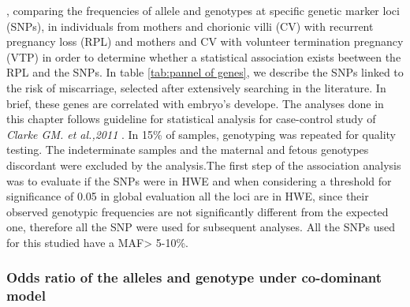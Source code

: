 \documentclass[journal,article,submit,moreauthors,pdftex]{Definitions/mdpi}
\begin{document}
, comparing the frequencies of allele and genotypes at specific genetic marker loci (SNPs), in individuals from mothers and chorionic villi (CV) with recurrent pregnancy loss (RPL) and mothers and CV with volunteer termination pregnancy (VTP) in order to determine whether a statistical association exists beetween the RPL and the SNPs. 
In table \ref{tab:pannel of genes}, we describe the SNPs linked to the risk of miscarriage, selected after extensively searching in the literature. In brief, these genes are correlated with embryo's develope. The analyses done in this chapter follows guideline for statistical analysis for case-control study of \textit{ Clarke GM. et al.,2011} \cite{clarke2011basic}. In 15\% of samples, genotyping was repeated for quality testing. The indeterminate samples and the maternal and fetous genotypes discordant were excluded by the analysis.The first step of the association analysis was to evaluate if the SNPs were in HWE and when considering a threshold for significance of 0.05 in global evaluation all the loci are in HWE, since their observed genotypic frequencies are not significantly different from the expected one, therefore all the SNP were used for subsequent analyses. All the SNPs used for this studied have a MAF> 5-10\%.

\unskip
\subsubsection{Odds ratio of the alleles and genotype under co-dominant model}
\end{document}
